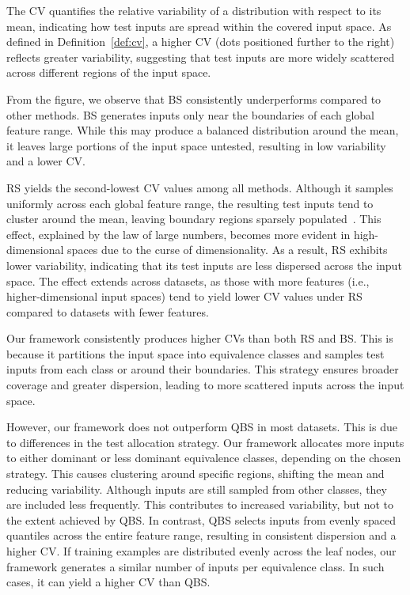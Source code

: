 \documentclass[
]{ceurart}
\theoremstyle{definition}
\begin{document}
The CV quantifies the relative variability of a distribution with respect to its mean, indicating how test inputs are spread within the covered input space. As defined in Definition~\ref{def:cv}, a higher CV (dots positioned further to the right) reflects greater variability, suggesting that test inputs are more widely scattered across different regions of the input space.

From the figure, we observe that BS consistently underperforms compared to other methods. BS generates inputs only near the boundaries of each global feature range. While this may produce a balanced distribution around the mean, it leaves large portions of the input space untested, resulting in low variability and a lower CV.

RS yields the second-lowest CV values among all methods. Although it samples uniformly across each global feature range, the resulting test inputs tend to cluster around the mean, leaving boundary regions sparsely populated~\cite{giraud}. This effect, explained by the law of large numbers, becomes more evident in high-dimensional spaces due to the curse of dimensionality. As a result, RS exhibits lower variability, indicating that its test inputs are less dispersed across the input space. The effect extends across datasets, as those with more features (i.e., higher-dimensional input spaces) tend to yield lower CV values under RS compared to datasets with fewer features.

Our framework consistently produces higher CVs than both RS and BS. This is because it partitions the input space into equivalence classes and samples test inputs from each class or around their boundaries. This strategy ensures broader coverage and greater dispersion, leading to more scattered inputs across the input space.

However, our framework does not outperform QBS in most datasets. This is due to differences in the test allocation strategy. Our framework allocates more inputs to either dominant or less dominant equivalence classes, depending on the chosen strategy. This causes clustering around specific regions, shifting the mean and reducing variability. Although inputs are still sampled from other classes, they are included less frequently. This contributes to increased variability, but not to the extent achieved by QBS. In contrast, QBS selects inputs from evenly spaced quantiles across the entire feature range, resulting in consistent dispersion and a higher CV. If training examples are distributed evenly across the leaf nodes, our framework generates a similar number of inputs per equivalence class. In such cases, it can yield a higher CV than QBS.
\end{document}
